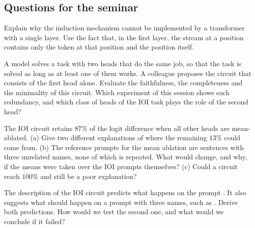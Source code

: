 \subsection*{Questions for the seminar}

\begin{exercise}\label{ex:induction}
Explain why the induction mechanism cannot be implemented by a transformer with a single layer. Use the fact
that, in the first layer, the stream at a position contains only the token at that position and the position
itself.
\end{exercise}

\begin{exercise}\label{ex:redundant}
A model solves a task with two heads that do the same job, so that the task is solved as long as at least one of
them works. A colleague proposes the circuit that consists of the first head alone. Evaluate the faithfulness,
the completeness and the minimality of this circuit. Which experiment of this session shows such redundancy,
and which class of heads of the IOI task plays the role of the second head?
\end{exercise}

\begin{exercise}\label{ex:eightyseven}
The IOI circuit retains $87\%$ of the logit difference when all other heads are mean-ablated. (a) Give two
different explanations of where the remaining $13\%$ could come from. (b) The reference prompts for the mean
ablation are sentences with three unrelated names, none of which is repeated. What would change, and why, if
the means were taken over the IOI prompts themselves? (c) Could a circuit reach $100\%$ and still be a poor
explanation?
\end{exercise}

\begin{exercise}[A prediction]\label{ex:prediction}
The description of the IOI circuit predicts what happens on the prompt . It also suggests what should happen on a prompt with three names, such as
. Derive both predictions. How would we
test the second one, and what would we conclude if it failed?
\end{exercise}

